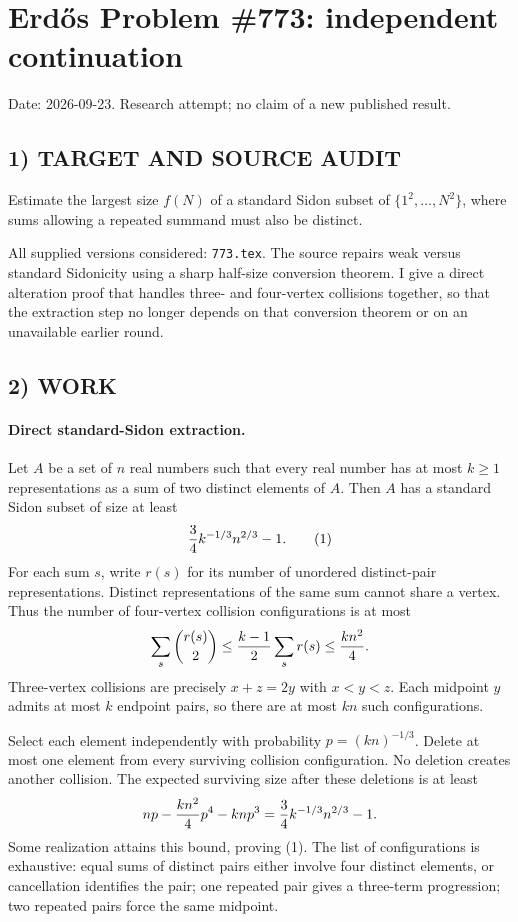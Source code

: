 \section{Erd\H{o}s Problem \#773: independent continuation}
\noindent Date: 2026-09-23. Research attempt; no claim of a new published result.
\subsection{1) TARGET AND SOURCE AUDIT}
Estimate the largest size $f(N)$ of a standard Sidon subset of $\{1^2,\ldots,N^2\}$, where sums allowing a repeated summand must also be distinct.

All supplied versions considered: \texttt{773.tex}.
The source repairs weak versus standard Sidonicity using a sharp half-size conversion theorem. I give a direct alteration proof that handles three- and four-vertex collisions together, so that the extraction step no longer depends on that conversion theorem or on an unavailable earlier round.
\subsection{2) WORK}
\paragraph{Direct standard-Sidon extraction.}
Let $A$ be a set of $n$ real numbers such that every real number has at most $k\ge1$ representations as a sum of two distinct elements of $A$. Then $A$ has a standard Sidon subset of size at least
\[
{3\over4}k^{-1/3}n^{2/3}-1. \tag{1}
\]
For each sum $s$, write $r(s)$ for its number of unordered distinct-pair representations. Distinct representations of the same sum cannot share a vertex. Thus the number of four-vertex collision configurations is at most
\[
\sum_s {r(s)\choose2}\le {k-1\over2}\sum_s r(s)
\le {kn^2\over4}.
\]
Three-vertex collisions are precisely $x+z=2y$ with $x<y<z$. Each midpoint $y$ admits at most $k$ endpoint pairs, so there are at most $kn$ such configurations.

Select each element independently with probability $p=(kn)^{-1/3}$. Delete at most one element from every surviving collision configuration. No deletion creates another collision. The expected surviving size after these deletions is at least
\[
np-{kn^2\over4}p^4-knp^3
={3\over4}k^{-1/3}n^{2/3}-1.
\]
Some realization attains this bound, proving (1). The list of configurations is exhaustive: equal sums of distinct pairs either involve four distinct elements, or cancellation identifies the pair; one repeated pair gives a three-term progression; two repeated pairs force the same midpoint.

